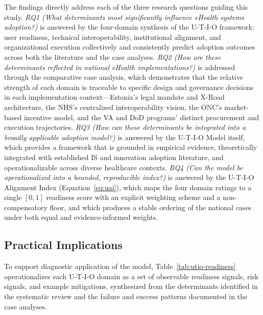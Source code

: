 The findings directly address each of the three research questions guiding this study. \textit{RQ1 (What determinants most significantly influence eHealth systems adoption?)} is answered by the four-domain synthesis of the U-T-I-O framework: user readiness, technical interoperability, institutional alignment, and organizational execution collectively and consistently predict adoption outcomes across both the literature and the case analyses. \textit{RQ2 (How are these determinants reflected in national eHealth implementations?)} is addressed through the comparative case analysis, which demonstrates that the relative strength of each domain is traceable to specific design and governance decisions in each implementation context—Estonia's legal mandate and X-Road architecture, the NHS's centralized interoperability vision, the ONC's market-based incentive model, and the VA and DoD programs' distinct procurement and execution trajectories. \textit{RQ3 (How can these determinants be integrated into a broadly applicable adoption model?)} is answered by the U-T-I-O Model itself, which provides a framework that is grounded in empirical evidence, theoretically integrated with established IS and innovation adoption literature, and operationalizable across diverse healthcare contexts. \textit{RQ4 (Can the model be operationalized into a bounded, reproducible index?)} is answered by the U-T-I-O Alignment Index (Equation~\ref{eq:uai}), which maps the four domain ratings to a single $[0,1]$ readiness score with an explicit weighting scheme and a non-compensatory floor, and which produces a stable ordering of the national cases under both equal and evidence-informed weights.

\subsection{Practical Implications}

To support diagnostic application of the model, Table~\ref{tab:utio-readiness} operationalizes each U-T-I-O domain as a set of observable readiness signals, risk signals, and example mitigations, synthesized from the determinants identified in the systematic review and the failure and success patterns documented in the case analyses.

